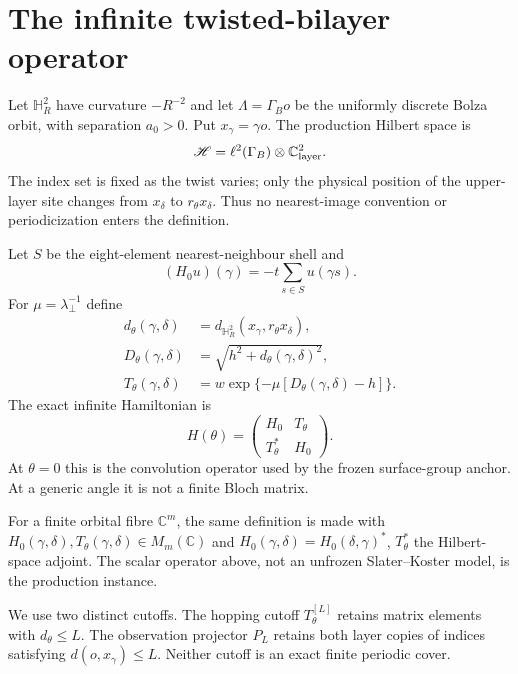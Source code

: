 \section{The infinite twisted-bilayer operator}
\label{sec:r7-operator}

Let $\mathbb H_R^2$ have curvature $-R^{-2}$ and let
$\Lambda=\Gamma_Bo$ be the uniformly discrete Bolza orbit, with separation
$a_0>0$.  Put $x_\gamma=\gamma o$.  The production Hilbert space is
\begin{equation}
 \mathscr H=\ell^2(\Gamma_B)\otimes\mathbb C^2_{\rm layer}.
\end{equation}
The index set is fixed as the twist varies; only the physical position of the
upper-layer site changes from $x_\delta$ to $r_\theta x_\delta$.  Thus no
nearest-image convention or periodicization enters the definition.

Let $S$ be the eight-element nearest-neighbour shell and
\begin{equation}
 (H_0u)(\gamma)=-t\sum_{s\in S}u(\gamma s).
\end{equation}
For $\mu=\lambda_\perp^{-1}$ define
\begin{align}
 d_\theta(\gamma,\delta)&=d_{\mathbb H_R^2}
       (x_\gamma,r_\theta x_\delta),\\
 D_\theta(\gamma,\delta)&=
       \sqrt{h^2+d_\theta(\gamma,\delta)^2},\\
 T_\theta(\gamma,\delta)&=
 w\exp\{-\mu[D_\theta(\gamma,\delta)-h]\}.
\end{align}
The exact infinite Hamiltonian is
\begin{equation}
 H(\theta)=
 \begin{pmatrix}H_0&T_\theta\\T_\theta^*&H_0\end{pmatrix}.
 \label{eq:r7-Htheta}
\end{equation}
At $\theta=0$ this is the convolution operator used by the frozen
surface-group anchor.  At a generic angle it is not a finite Bloch matrix.

For a finite orbital fibre $\mathbb C^m$, the same definition is made with
$H_0(\gamma,\delta),T_\theta(\gamma,\delta)\in M_m(\mathbb C)$ and
$H_0(\gamma,\delta)=H_0(\delta,\gamma)^*$,
$T_\theta^*$ the Hilbert-space adjoint.  The scalar operator above, not an
unfrozen Slater--Koster model, is the production instance.

We use two distinct cutoffs.  The hopping cutoff $T_\theta^{[L]}$ retains
matrix elements with $d_\theta\le L$.  The observation projector $P_L$
retains both layer copies of indices satisfying $d(o,x_\gamma)\le L$.
Neither cutoff is an exact finite periodic cover.
